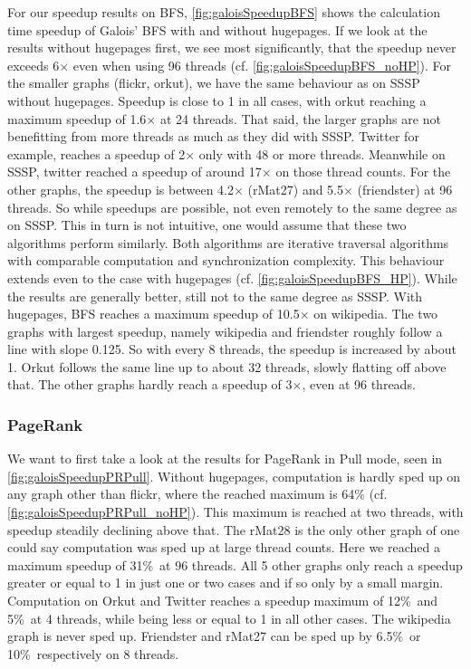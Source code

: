 For our speedup results on BFS, \autoref{fig:galoisSpeedupBFS} shows the calculation time speedup of Galois' BFS with and without hugepages.
If we look at the results without hugepages first, we see most significantly, that the speedup never exceeds 6$\times$ even when using 96 threads (cf. \autoref{fig:galoisSpeedupBFS_noHP}).
For the smaller graphs (flickr, orkut), we have the same behaviour as on SSSP without hugepages. Speedup is close to 1 in all cases, with orkut reaching a maximum speedup of 1.6$\times$ at 24 threads.
That said, the larger graphs are not benefitting from more threads as much as they did with SSSP. Twitter for example, reaches a speedup of 2$\times$ only with 48 or more threads. Meanwhile on SSSP, twitter reached a speedup of around 17$\times$ on those thread counts.
For the other graphs, the speedup is between 4.2$\times$ (rMat27) and 5.5$\times$ (friendster) at 96 threads. So while speedups are possible, not even remotely to the same degree as on SSSP. This in turn is not intuitive, one would assume that these two algorithms perform similarly. Both algorithms are iterative traversal algorithms with comparable computation and synchronization complexity.
This behaviour extends even to the case with hugepages (cf. \autoref{fig:galoisSpeedupBFS_HP}). While the results are generally better, still not to the same degree as SSSP. With hugepages, BFS reaches a maximum speedup of 10.5$\times$ on wikipedia. The two graphs with largest speedup, namely wikipedia and friendster roughly follow a line with slope 0.125. So with every 8 threads, the speedup is increased by about 1. Orkut follows the same line up to about 32 threads, slowly flatting off above that.
The other graphs hardly reach a speedup of 3$\times$, even at 96 threads.


\subsubsection{PageRank}
We want to first take a look at the results for PageRank in Pull mode, seen in \autoref{fig:galoisSpeedupPRPull}. Without hugepages, computation is hardly sped up on any graph other than flickr, where the reached maximum is 64\% (cf. \autoref{fig:galoisSpeedupPRPull_noHP}). This maximum is reached at two threads, with speedup steadily declining above that.
The rMat28 is the only other graph of one could say computation was sped up at large thread counts. Here we reached a maximum speedup of 31\%\ at 96 threads.
All 5 other graphs only reach a speedup greater or equal to 1 in just one or two cases and if so only by a small margin.
Computation on Orkut and Twitter reaches a speedup maximum of 12\%\ and 5\%\ at 4 threads, while being less or equal to 1 in all other cases.
The wikipedia graph is never sped up.
Friendster and rMat27 can be sped up by 6.5\%\ or 10\%\ respectively on 8 threads.

